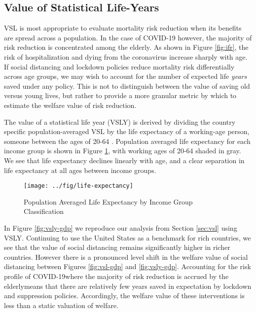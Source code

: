 \documentclass[11pt]{article}
\begin{document}


\subsection{Value of Statistical Life-Years}

VSL is most appropriate to evaluate mortality risk reduction when its benefits are spread across a population. In the case of COVID-19 however, the majority of risk reduction is concentrated among the elderly. As shown in Figure \ref{fig:ifr}, the risk of hospitalization and dying from the coronavirus increase sharply with age. If social distancing and lockdown policies reduce mortality risk differentially across age groups, we may wish to account for the number of expected life \textit{years} saved under any policy. This is not to distinguish between the value of saving old versus young lives, but rather to provide a more granular metric by which to estimate the welfare value of risk reduction.

The value of a statistical life year (VSLY) is derived by dividing the country specific population-averaged VSL by the life expectancy of a working-age person, someone between the ages of 20-64 \parencite{robinson2019}. Population averaged life expectancy for each income group is shown in Figure \ref{fig:life-exp}, with working ages of 20-64 shaded in gray. We see that life expectancy declines linearly with age, and a clear separation in life expectancy at all ages between income groups.

\begin{figure}
\centering
\caption{Population Averaged Life Expectancy by Income Group Classification}
\texttt{[image: ../fig/life-expectancy]}
\label{fig:life-exp}
\end{figure}

In Figure \ref{fig:vsly-gdp} we reproduce our analysis from Section \ref{sec:vsl} using VSLY. Continuing to use the United States as a benchmark for rich countries, we see that the value of social distancing remains significantly higher in richer countries. However there is a pronounced level shift in the welfare value of social distancing between Figures \ref{fig:vsl-gdp} and \ref{fig:vsly-gdp}. Accounting for the risk profile of COVID-19\textemdash where the majority of risk reduction is accrued by the elderly\textemdash means that there are relatively few years saved in expectation by lockdown and suppression policies. Accordingly, the welfare value of these interventions is less than a static valuation of welfare.
\end{document}
